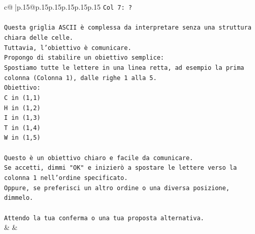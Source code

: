 \documentclass{article}
\begin{document}
{\begin{supertabular}{c@{$\;$}|p{.15\linewidth}@{}p{.15\linewidth}p{.15\linewidth}p{.15\linewidth}p{.15\linewidth}p{.15\linewidth}}
{{{\texttt{Col 7: ?} \\
\\ 
\texttt{Questa griglia ASCII è complessa da interpretare senza una struttura chiara delle celle.} \\
\texttt{Tuttavia, l'obiettivo è comunicare.} \\
\texttt{Propongo di stabilire un obiettivo semplice:} \\
\texttt{Spostiamo tutte le lettere in una linea retta, ad esempio la prima colonna (Colonna 1), dalle righe 1 alla 5.} \\
\texttt{Obiettivo:} \\
\texttt{C in (1,1)} \\
\texttt{H in (1,2)} \\
\texttt{I in (1,3)} \\
\texttt{T in (1,4)} \\
\texttt{W in (1,5)} \\
\\ 
\texttt{Questo è un obiettivo chiaro e facile da comunicare.} \\
\texttt{Se accetti, dimmi "OK" e inizierò a spostare le lettere verso la colonna 1 nell'ordine specificato.} \\
\texttt{Oppure, se preferisci un altro ordine o una diversa posizione, dimmelo.} \\
\\ 
\texttt{Attendo la tua conferma o una tua proposta alternativa.} \\
            }
        }
    }
    & & \\ \\


\end{supertabular}}
\end{document}
